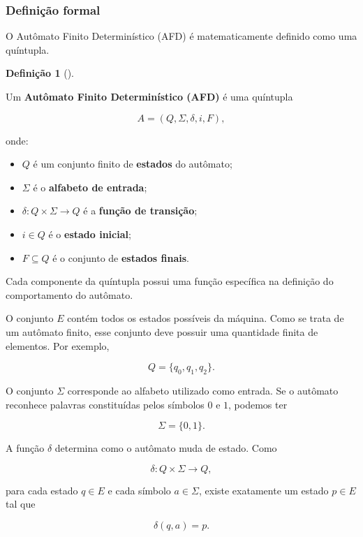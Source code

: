 \documentclass[
  brazilian,
  letterpaper,
]{book}
\providecommand{\tightlist}{%
  \setlength{\itemsep}{0pt}\setlength{\parskip}{0pt}}
\theoremstyle{plain}
\theoremstyle{definition}
\newtheorem{definition}{Definição}[chapter]
\theoremstyle{remark}
\begin{document}
\subsubsection{Definição formal}\label{definiuxe7uxe3o-formal}

O Autômato Finito Determinístico (AFD) é matematicamente definido como
uma quíntupla.

\begin{definition}[]\protect\hypertarget{def-afd}{}\label{def-afd}

Um \textbf{Autômato Finito Determinístico (AFD)} é uma quíntupla

\[
A=(Q,\Sigma,\delta,i,F),
\]

onde:

\begin{itemize}
\tightlist
\item
  \(Q\) é um conjunto finito de \textbf{estados} do autômato;
\item
  \(\Sigma\) é o \textbf{alfabeto de entrada};
\item
  \(\delta:Q\times\Sigma\rightarrow Q\) é a \textbf{função de
  transição};
\item
  \(i\in Q\) é o \textbf{estado inicial};
\item
  \(F\subseteq Q\) é o conjunto de \textbf{estados finais}.
\end{itemize}

\end{definition}

Cada componente da quíntupla possui uma função específica na definição
do comportamento do autômato.

O conjunto \(E\) contém todos os estados possíveis da máquina. Como se
trata de um autômato finito, esse conjunto deve possuir uma quantidade
finita de elementos. Por exemplo,

\[
Q=\{q_0,q_1,q_2\}.
\]

O conjunto \(\Sigma\) corresponde ao alfabeto utilizado como entrada. Se
o autômato reconhece palavras constituídas pelos símbolos \(0\) e \(1\),
podemos ter

\[
\Sigma=\{0,1\}.
\]

A função \(\delta\) determina como o autômato muda de estado. Como

\[
\delta:Q\times\Sigma\rightarrow Q,
\]

para cada estado \(q\in E\) e cada símbolo \(a\in\Sigma\), existe
exatamente um estado \(p\in E\) tal que

\[
\delta(q,a)=p.
\]
\end{document}
